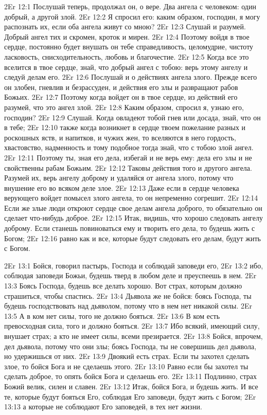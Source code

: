 \vs 2Er 12:1
Послушай теперь,
продолжал он, о вере. Два ангела с человеком: один добрый, а другой злой.
\vs 2Er 12:2
Я спросил его: каким
образом, господин, я могу распознать их, если оба ангела живут со мною?
\vs 2Er 12:3
Слушай и разумей. Добрый
ангел тих и скромен, кроток и мирен.
\vs 2Er 12:4
Поэтому войдя в твое
сердце, постоянно будет внушать он тебе справедливость, целомудрие, чистоту
ласковость, снисходительность, любовь и благочестие.
\vs 2Er 12:5
Когда все это вселится в
твое сердце, знай, что добрый ангел с тобою: верь этому ангелу и следуй делам
его.
\vs 2Er 12:6
Послушай и о действиях
ангела злого. Прежде всего он злобен, гневлив и безрассуден, и действия его
злы и развращают рабов Божьих.
\vs 2Er 12:7
Поэтому когда войдет он в
твое сердце, из действий его разумей, что это ангел злой.
\vs 2Er 12:8
Каким образом, спросил
я, узнаю его, господин?
\vs 2Er 12:9
Слушай. Когда овладеют
тобой гнев или досада, знай, что он в тебе;
\vs 2Er 12:10
также когда возникнет в
сердце твоем пожелание разных и роскошных яств, и напитков, и чужих жен, то
вселяются в него гордость, хвастовство, надменность и тому подобное тогда
знай, что с тобою злой ангел.
\vs 2Er 12:11
Поэтому ты, зная его
дела, избегай и не верь ему: дела его злы и не свойственны рабам Божьим.
\vs 2Er 12:12
Таковы действия того и
другого ангела. Разумей их, верь ангелу доброму и удаляйся от ангела злого,
потому что внушение его во всяком деле злое.
\vs 2Er 12:13
Даже если в сердце
человека верующего войдет помысел злого ангела, то он непременно согрешит.
\vs 2Er 12:14
Если же злые люди откроют
сердце свое делам ангела доброго, то обязательно он сделает что-нибудь доброе.
\vs 2Er 12:15
Итак, видишь, что хорошо
следовать ангелу доброму. Если станешь повиноваться ему и творить его дела, то
будешь жить с Богом;
\vs 2Er 12:16
равно как и все, которые
будут следовать его делам, будут жить с Богом.

\vs 2Er 13:1
Бойся, говорил пастырь, Господа и соблюдай заповеди его,
\vs 2Er 13:2
ибо, соблюдая заповеди
Божьи, будешь тверд в любом деле и преуспеешь в нем.
\vs 2Er 13:3
Боясь Господа, будешь все
делать хорошо. Вот страх, которым должно страшиться, чтобы спастись.
\vs 2Er 13:4
Дьявола же не бойся: боясь
Господа, ты будешь господствовать над дьяволом, потому что в нем нет никакой
силы.
\vs 2Er 13:5
А в ком нет силы, того не
должно бояться.
\vs 2Er 13:6
В ком есть превосходная
сила, того и должно бояться.
\vs 2Er 13:7
Ибо всякий, имеющий силу,
внушает страх; а кто не имеет силы, всеми презирается.
\vs 2Er 13:8
Бойся, впрочем, дел
дьявола, потому что они злы; боясь Господа, ты не совершишь дел дьявола, но
удержишься от них.
\vs 2Er 13:9
Двоякий есть страх. Если
ты захотел сделать злое, то бойся Бога и не сделаешь этого.
\vs 2Er 13:10
Равно если бы захотел ты
сделать доброе, то опять бойся Бога и сделаешь его.
\vs 2Er 13:11
Подлинно, страх Божий
велик, силен и славен.
\vs 2Er 13:12
Итак, бойся Бога, и
будешь жить. И все те, которые будут бояться Его, соблюдая Его заповеди, будут
жить с Богом;
\vs 2Er 13:13
а которые не соблюдают
Его заповедей, в тех нет жизни.

